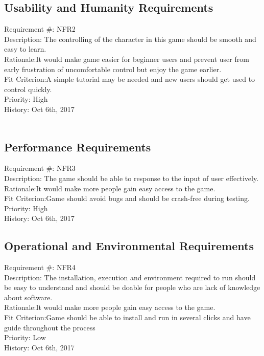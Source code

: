 \documentclass[12pt, titlepage]{article}
\begin{document}
\subsection{Usability and Humanity Requirements}

Requirement \#: NFR2\\
Description: The controlling of the character in this game should be smooth and easy to learn.\\
Rationale:It would make game easier for beginner users and prevent user from early frustration of uncomfortable control but enjoy the game earlier.\\
Fit Criterion:A simple tutorial may be needed and new users should get used to control quickly.\\
Priority: High\\
History: Oct 6th, 2017\\\\

\subsection{Performance Requirements}
Requirement \#: NFR3\\
Description: The game should be able to response to the input of user effectively.\\
Rationale:It would make more people gain easy access to the game.\\
Fit Criterion:Game should avoid bugs and should be crash-free during testing.\\
Priority: High\\
History: Oct 6th, 2017\\

\subsection{Operational and Environmental Requirements}
Requirement \#: NFR4\\
Description: The installation, execution and environment required to run should be easy to understand and should be doable for people who are lack of knowledge about software.\\
Rationale:It would make more people gain easy access to the game.\\
Fit Criterion:Game should be able to install and run in several clicks and have guide throughout the process\\
Priority: Low\\
History: Oct 6th, 2017\\
\end{document}
